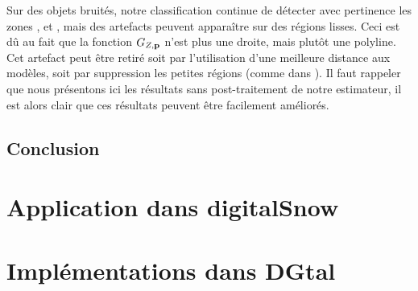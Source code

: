 Sur des objets bruités, notre classification continue de détecter avec
pertinence les zones \featedge, \featsmooth et \featflat, mais des artefacts
peuvent apparaître sur des régions lisses. Ceci est dû au fait que la fonction
$G_{Z,\mathbf{p}}$ n'est plus une droite, mais plutôt une polyline. Cet artefact peut
être retiré soit par l'utilisation d'une meilleure distance aux modèles, soit
par suppression les petites régions \featedge (comme dans \cite{Park2012}). Il
faut rappeler que nous présentons ici les résultats sans post-traitement de
notre estimateur, il est alors clair que ces résultats peuvent être facilement
améliorés.
%
\subsection{Conclusion}
%
%
\section{Application dans digitalSnow}%
\label{sec:applications:digitalsnow}
%
\section{Implémentations dans DGtal}%
\label{sec:applications:dgtal}
%
